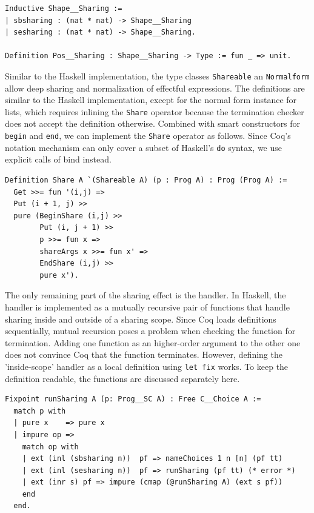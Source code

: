 \documentclass[a4paper, 11pt, fleqn, twoside, abstract=on]{scrreprt}
\newcommand{\hinl}[1]{\texttt{#1}}
\newcommand{\cinl}[1]{\texttt{#1}}
\begin{document}
\begin{verbatim}
Inductive Shape__Sharing :=
| sbsharing : (nat * nat) -> Shape__Sharing
| sesharing : (nat * nat) -> Shape__Sharing.

Definition Pos__Sharing : Shape__Sharing -> Type := fun _ => unit.
\end{verbatim}

Similar to the Haskell implementation, the type classes \cinl{Shareable} an \cinl{Normalform} allow deep sharing and normalization of effectful expressions.
The definitions are similar to the Haskell implementation, except for the normal form instance for lists, which requires inlining the \cinl{Share} operator because the termination checker does not accept the definition otherwise. 
Combined with smart constructors for \cinl{begin} and \cinl{end}, we can implement the \cinl{Share} operator as follows.
Since Coq's notation mechanism can only cover a subset of Haskell's \hinl{do} syntax, we use explicit calls of bind instead.

\begin{verbatim}
Definition Share A `(Shareable A) (p : Prog A) : Prog (Prog A) :=
  Get >>= fun '(i,j) =>
  Put (i + 1, j) >>
  pure (BeginShare (i,j) >>
        Put (i, j + 1) >>
        p >>= fun x =>
        shareArgs x >>= fun x' =>
        EndShare (i,j) >>
        pure x').
\end{verbatim}

The only remaining part of the sharing effect is the handler.
In Haskell, the handler is implemented as a mutually recursive pair of functions that handle sharing inside and outside of a sharing scope.
Since Coq loads definitions sequentially, mutual recursion poses a problem when checking the function for termination.
Adding one function as an higher-order argument to the other one does not convince Coq that the function terminates.
However, defining the 'inside-scope' handler as a local definition using \cinl{let fix} works.
To keep the definition readable, the functions are discussed separately here.

\begin{verbatim}
Fixpoint runSharing A (p: Prog__SC A) : Free C__Choice A :=
  match p with
  | pure x    => pure x
  | impure op =>
    match op with
    | ext (inl (sbsharing n))  pf => nameChoices 1 n [n] (pf tt)
    | ext (inl (sesharing n))  pf => runSharing (pf tt) (* error *)
    | ext (inr s) pf => impure (cmap (@runSharing A) (ext s pf))
    end
  end.
\end{verbatim}
\end{document}
